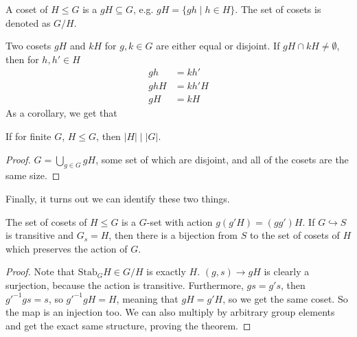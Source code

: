 \begin{definition}
    A coset of $H \leq G$ is a $gH \subseteq G$, e.g. $gH = \{gh \mid h \in H\}$.
    The set of cosets is denoted as $G/H$.
\end{definition}
Two cosets $gH$ and $kH$ for $g, k \in G$ are either equal or disjoint.
If $gH \cap kH \neq \emptyset$, then for $h, h' \in H$
\begin{align*}
    gh &= kh' \\
    ghH &= kh' H \\
    gH &= kH
\end{align*}
As a corollary, we get that
\begin{theorem}
    If for finite $G$, $H \le G$, then $|H| \mid |G|$. 
    \begin{proof}
    $G = \bigcup_{g \in G} gH$, some set of which are disjoint,
    and all of the cosets are the same size.
    \end{proof}
\end{theorem}
Finally, it turns out we can identify these two things.
\begin{theorem}
The set of cosets of $H \le G$ is a $G$-set with action $g(g'H) = (gg')H$.
If $G \hookrightarrow S$ is transitive and $G_s = H$,
then there is a bijection from $S$ to the set of cosets of $H$ which preserves
the action of $G$.
\begin{proof}
    Note that $\text{Stab}_G H \in G/H$ is exactly $H$.
    $(g, s) \to gH$ is clearly a surjection, because the action is transitive.
    Furthermore, $gs = g's$, then $g'^{-1}g s = s$, so $g'^{-1} g H = H$,
    meaning that $gH = g' H$, so we get the same coset. So the map is an injection too.
    We can also multiply by arbitrary group elements and get the exact same structure, proving the theorem.
\end{proof}
\end{theorem}

